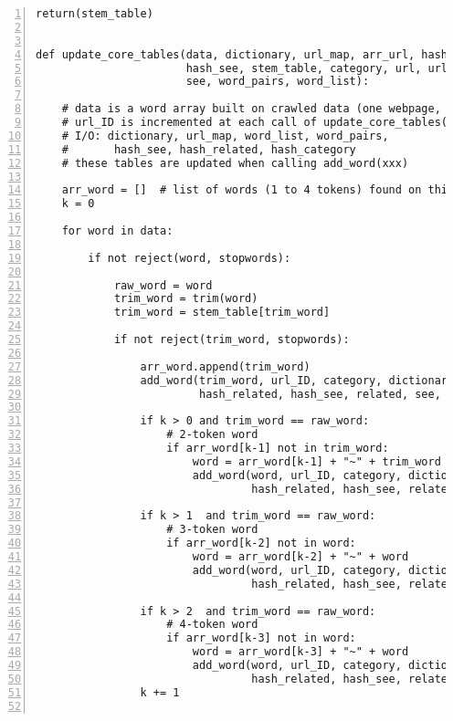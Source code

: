 \documentclass[oneside,10pt]{book}
\begin{document}
\begin{lstlisting}[numbers=left]
    return(stem_table)


def update_core_tables(data, dictionary, url_map, arr_url, hash_category, hash_related, 
                       hash_see, stem_table, category, url, url_ID, stopwords, related, 
                       see, word_pairs, word_list):

    # data is a word array built on crawled data (one webpage, the url)
    # url_ID is incremented at each call of update_core_tables(xx)
    # I/O: dictionary, url_map, word_list, word_pairs, 
    #       hash_see, hash_related, hash_category
    # these tables are updated when calling add_word(xxx)
    
    arr_word = []  # list of words (1 to 4 tokens) found on this page, local array
    k = 0

    for word in data:

        if not reject(word, stopwords):

            raw_word = word
            trim_word = trim(word) 
            trim_word = stem_table[trim_word]

            if not reject(trim_word, stopwords):

                arr_word.append(trim_word)  
                add_word(trim_word, url_ID, category, dictionary, url_map, hash_category, 
                         hash_related, hash_see, related, see, word_pairs, word_list)

                if k > 0 and trim_word == raw_word:
                    # 2-token word
                    if arr_word[k-1] not in trim_word:
                        word = arr_word[k-1] + "~" + trim_word
                        add_word(word, url_ID, category, dictionary, url_map, hash_category, 
                                 hash_related, hash_see, related, see, word_pairs, word_list)

                if k > 1  and trim_word == raw_word:
                    # 3-token word
                    if arr_word[k-2] not in word:
                        word = arr_word[k-2] + "~" + word
                        add_word(word, url_ID, category, dictionary, url_map, hash_category, 
                                 hash_related, hash_see, related, see, word_pairs, word_list)

                if k > 2  and trim_word == raw_word:
                    # 4-token word
                    if arr_word[k-3] not in word:
                        word = arr_word[k-3] + "~" + word      
                        add_word(word, url_ID, category, dictionary, url_map, hash_category, 
                                 hash_related, hash_see, related, see, word_pairs, word_list)
                k += 1


\end{lstlisting}
\end{document}
